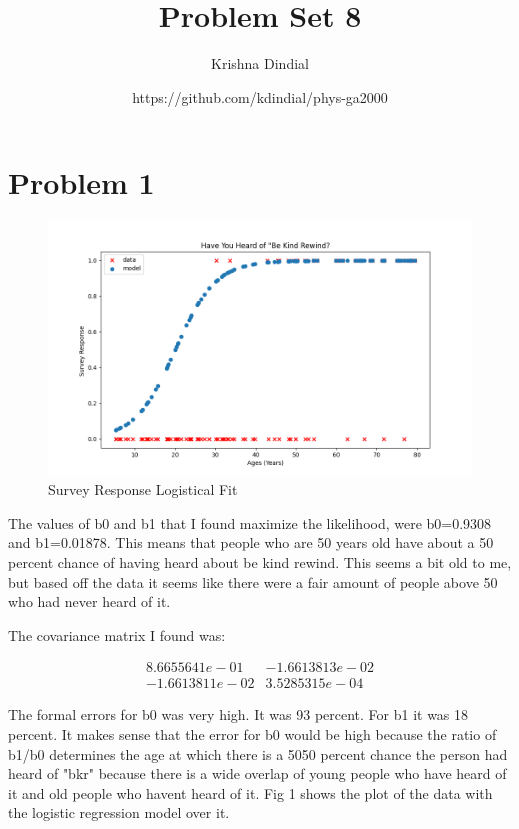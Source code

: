 \documentclass{article}
\title{Problem Set 8}
\author{Krishna Dindial }
\date{https://github.com/kdindial/phys-ga2000}
\begin{document}
\maketitle

\section{Problem 1}
\begin{figure}
    \centering
    \includegraphics[width=\linewidth]{fit.png}
    \caption{Survey Response Logistical Fit}
    \label{fig:enter-label}
\end{figure}


The values of b0 and b1 that I found maximize the likelihood, were b0=0.9308 and b1=0.01878. This means that people who are 50 years old have about a 50 percent chance of having heard about be kind rewind. This seems a bit old to me, but based off the data it seems like there were a fair amount of people above 50 who had never heard of it. \par
The covariance matrix I found was:

\begin{equation}
    \begin{array}{cc}
       8.6655641e-01  &-1.6613813e-02\\
      -1.6613811e-02   & 3.5285315e-04

    \end{array}
\end{equation}

The formal errors for b0 was very high. It was 93 percent. For b1 it was 18 percent. It makes sense that the error for b0 would be high because the ratio of b1/b0 determines the age at which there is a 5050 percent chance the person had heard of "bkr" because there is a wide overlap of young people who have heard of it and old people who havent heard of it. Fig 1 shows the plot of the data with the logistic regression model over it.
\end{document}
